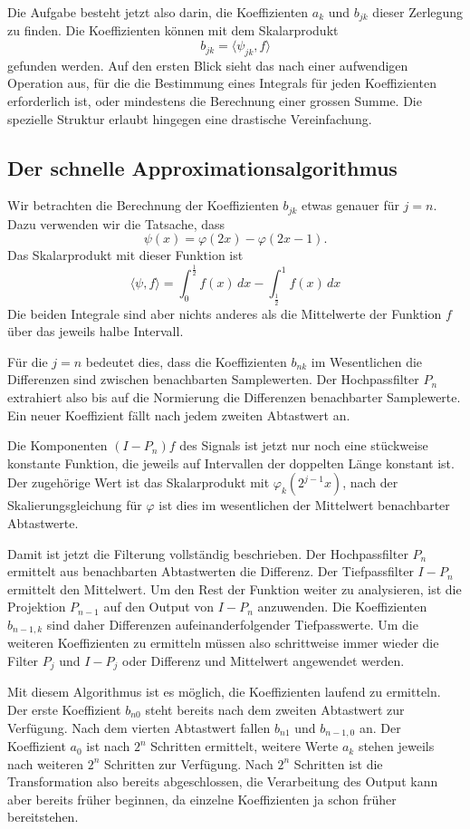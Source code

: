 Die Aufgabe besteht jetzt also darin, die Koeffizienten $a_k$ und
$b_{jk}$ dieser Zerlegung zu finden.
Die Koeffizienten können mit dem Skalarprodukt
\[
b_{jk} = \langle \psi_{jk}, f\rangle
\]
gefunden werden.
Auf den ersten Blick sieht das nach einer aufwendigen Operation
aus, für die die Bestimmung eines Integrals für jeden Koeffizienten
erforderlich ist, oder mindestens die Berechnung einer grossen Summe.
Die spezielle Struktur erlaubt hingegen eine drastische Vereinfachung.


\subsection{Der schnelle Approximationsalgorithmus}
Wir betrachten die Berechnung der Koeffizienten $b_{jk}$ etwas genauer für
$j=n$.
Dazu verwenden wir die Tatsache, dass 
\[
\psi(x) = \varphi(2x) - \varphi(2x-1).
\]
Das Skalarprodukt mit dieser Funktion ist
\[
\langle \psi,f\rangle
=
\int_0^{\frac12} f(x)\,dx - \int_{\frac12}^1 f(x)\,dx
\]
Die beiden Integrale sind aber nichts anderes als die Mittelwerte
der Funktion $f$ über das jeweils halbe Intervall.

Für die $j=n$ bedeutet dies, dass die Koeffizienten $b_{nk}$ im Wesentlichen
die Differenzen sind zwischen benachbarten Samplewerten.
Der Hochpassfilter $P_n$ extrahiert also bis auf die Normierung
die Differenzen benachbarter Samplewerte.
Ein neuer Koeffizient fällt nach jedem zweiten Abtastwert an.

Die Komponenten $(I-P_n)f$ des Signals ist jetzt nur noch eine stückweise
konstante Funktion, die jeweils auf Intervallen der doppelten Länge konstant
ist.
Der zugehörige Wert ist das Skalarprodukt mit $\varphi_k(2^{j-1}x)$, nach
der Skalierungsgleichung für $\varphi$ ist dies im wesentlichen der
Mittelwert benachbarter Abtastwerte.

Damit ist jetzt die Filterung vollständig beschrieben.
Der Hochpassfilter $P_n$ ermittelt aus benachbarten Abtastwerten die
Differenz.
Der Tiefpassfilter $I-P_n$ ermittelt den Mittelwert.
Um den Rest der Funktion weiter zu analysieren, ist die Projektion $P_{n-1}$
auf den Output von $I-P_n$ anzuwenden.
Die Koeffizienten $b_{n-1,k}$ sind daher Differenzen aufeinanderfolgender
Tiefpasswerte.
Um die weiteren Koeffizienten zu ermitteln müssen also schrittweise
immer wieder die Filter $P_j$ und $I-P_j$ oder Differenz und Mittelwert
angewendet werden.

Mit diesem Algorithmus ist es möglich, die Koeffizienten laufend zu ermitteln.
Der erste Koeffizient $b_{n0}$ steht bereits nach dem zweiten Abtastwert zur
Verfügung.
Nach dem vierten Abtastwert fallen $b_{n1}$ und $b_{n-1,0}$ an.
Der Koeffizient $a_0$ ist nach $2^n$ Schritten ermittelt, weitere
Werte $a_k$ stehen jeweils nach weiteren $2^n$ Schritten zur Verfügung.
Nach $2^n$ Schritten ist die Transformation also bereits abgeschlossen,
die Verarbeitung des Output kann aber bereits früher beginnen, da einzelne
Koeffizienten ja schon früher bereitstehen.

